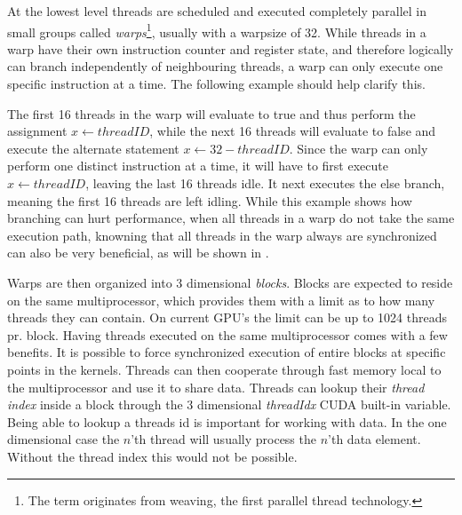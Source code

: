 
At the lowest level threads are scheduled and executed completely
parallel in small groups called \textit{warps}\footnote{The term
  originates from weaving, the first parallel thread
  technology.}, usually with a warpsize of 32. While
threads in a warp have their own instruction counter and register
state, and therefore logically can branch independently of
neighbouring threads, a warp can only execute one specific instruction
at a time. The following example should help clarify this.

\begin{algorithmic}
  \ELSE
  \ENDIF
\end{algorithmic}


The first 16 threads in the warp will evaluate to true and thus
perform the assignment $x \leftarrow threadID$, while the next 16
threads will evaluate to false and execute the alternate statement $x
\leftarrow 32 - threadID$. Since the warp can only perform one
distinct instruction at a time, it will have to first execute $x
\leftarrow threadID$, leaving the last 16 threads idle. It next
executes the else branch, meaning the first 16 threads are left
idling. While this example shows how branching can hurt performance,
when all threads in a warp do not take the same execution path,
knowning that all threads in the warp always are synchronized can also
be very beneficial, as will be shown in
.



Warps are then organized into 3 dimensional \textit{blocks}. Blocks
are expected to reside on the same multiprocessor, which provides them
with a limit as to how many threads they can contain. On current GPU's
the limit can be up to 1024 threads pr. block. Having threads executed
on the same multiprocessor comes with a few benefits. It is possible
to force synchronized execution of entire blocks at specific points in
the kernels. Threads can then cooperate through fast memory local to
the multiprocessor and use it to share data. Threads can lookup their
\textit{thread index} inside a block through the 3 dimensional
\textit{threadIdx} CUDA built-in variable. Being able to lookup a
threads id is important for working with data. In the one dimensional
case the $n$'th thread will usually process the $n$'th data
element. Without the thread index this would not be possible.

